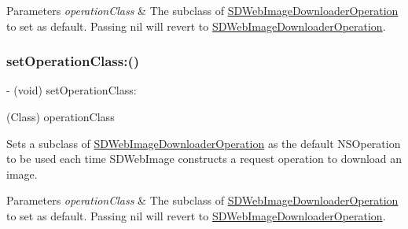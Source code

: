 \begin{DoxyParams}{Parameters}
{\em operation\+Class} & The subclass of {\ttfamily \mbox{\hyperlink{interface_s_d_web_image_downloader_operation}{S\+D\+Web\+Image\+Downloader\+Operation}}} to set as default. Passing {\ttfamily nil} will revert to {\ttfamily \mbox{\hyperlink{interface_s_d_web_image_downloader_operation}{S\+D\+Web\+Image\+Downloader\+Operation}}}. \\
\hline
\end{DoxyParams}
\mbox{\label{interface_s_d_web_image_downloader_a27a55eb9ae3c7b1c9f3a2617420390e9}} 
\subsubsection{\texorpdfstring{set\+Operation\+Class\+:()}{setOperationClass:()}\hspace{0.1cm}{\footnotesize\ttfamily [3/3]}}
{\footnotesize\ttfamily -\/ (void) set\+Operation\+Class\+: \begin{DoxyParamCaption}\item[{(Class)}]{operation\+Class }\end{DoxyParamCaption}}

Sets a subclass of {\ttfamily \mbox{\hyperlink{interface_s_d_web_image_downloader_operation}{S\+D\+Web\+Image\+Downloader\+Operation}}} as the default {\ttfamily N\+S\+Operation} to be used each time S\+D\+Web\+Image constructs a request operation to download an image.


\begin{DoxyParams}{Parameters}
{\em operation\+Class} & The subclass of {\ttfamily \mbox{\hyperlink{interface_s_d_web_image_downloader_operation}{S\+D\+Web\+Image\+Downloader\+Operation}}} to set as default. Passing {\ttfamily nil} will revert to {\ttfamily \mbox{\hyperlink{interface_s_d_web_image_downloader_operation}{S\+D\+Web\+Image\+Downloader\+Operation}}}. \\
\hline
\end{DoxyParams}
\mbox{\label{interface_s_d_web_image_downloader_aa477f2fb00e135fbaa7cef40111feb06}} 
